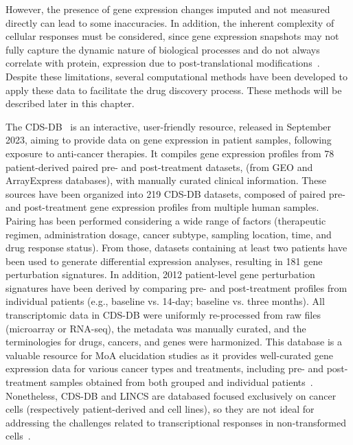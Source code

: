 However, the presence of gene expression changes imputed and not measured directly can lead to some inaccuracies. 
In addition, the inherent complexity of cellular responses must be considered, since gene expression snapshots may not fully capture the dynamic nature of biological processes and do not always correlate with protein, expression due to post-translational modifications~\cite{RN38}. 
Despite these limitations, several computational methods have been developed to apply these data to facilitate the drug discovery process. 
These methods will be described later in this chapter. 


The \gls{CDS-DB}~\cite{RN84} is an interactive, user-friendly resource, released in September 2023, aiming to provide data on gene expression in patient samples, following exposure to anti-cancer therapies. 
It compiles gene expression profiles from 78 patient-derived paired pre- and post-treatment datasets, (from \gls{GEO} and ArrayExpress databases), with manually curated clinical information. These sources have been organized into 219 \gls{CDS-DB} datasets, composed of paired pre- and post-treatment gene expression profiles from multiple human samples. 
Pairing has been performed considering a wide range of factors (therapeutic regimen, administration dosage, cancer subtype, sampling location, time, and drug response status). 
From those, datasets containing at least two patients have been used to generate differential expression analyses, resulting in 181 gene perturbation signatures. 
In addition, 2012 patient-level gene perturbation signatures have been derived by comparing pre- and post-treatment profiles from individual patients (e.g., baseline vs. 14-day; baseline vs. three months). 
All transcriptomic data in \gls{CDS-DB} were uniformly re-processed from raw files (microarray or RNA-seq), the metadata was manually curated, and the terminologies for drugs, cancers, and genes were harmonized. 
This database is a valuable resource for MoA elucidation studies as it provides well-curated gene expression data for various cancer types and treatments, including pre- and post-treatment samples obtained from both grouped and individual patients~\cite{RN84}. 
Nonetheless, \gls{CDS-DB} and \gls{LINCS} are databased focused exclusively on cancer cells (respectively patient-derived and cell lines), so they are not ideal for addressing the challenges related to transcriptional responses in non-transformed cells~\cite{RN86}.

